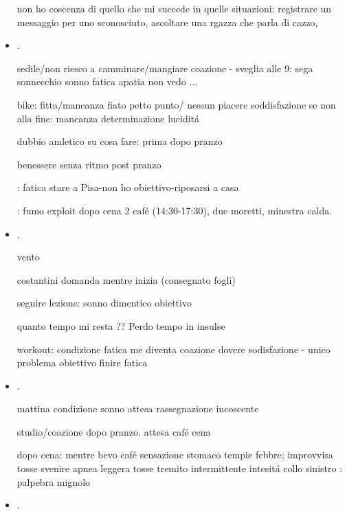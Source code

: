 \begin{itemize}
non ho coscenza di quello che mi succede in quelle situazioni: registrare un messaggio per uno sconosciuto, ascoltare una rgazza che parla di cazzo, 


\item {}.

sedile/non riesco a camminare/mangiare coazione - sveglia alle 9: sega sonnecchio sonno fatica apatia non vedo ...

bike: fitta/mancanza fiato petto punto/ nessun piacere soddisfazione se non alla fine:  mancanza determinazione lucidit\'a

dubbio amletico su cosa fare: prima dopo pranzo

benessere senza ritmo post pranzo


: fatica stare a Pisa-non ho obiettivo-riposarsi a casa

: fumo exploit dopo cena 2 caf\'e (14:30-17:30), due moretti, minestra calda.



\item {}.

vento

costantini domanda mentre inizia (consegnato fogli)

seguire lezione: sonno dimentico obiettivo

quanto tempo mi resta ?? Perdo tempo in insulse

workout: condizione fatica me diventa coazione dovere sodisfazione - unico problema obiettivo finire fatica

\item {}.

mattina condizione sonno attesa rassegnazione incoscente

studio/coazione dopo pranzo. attesa caf\'e cena

dopo cena: mentre bevo caf\'e sensazione stomaco tempie febbre; improvvisa tosse svenire apnea leggera tosse tremito intermittente intesit\'a collo sinistro
: palpebra mignolo 

\item {}.


\end{itemize}
